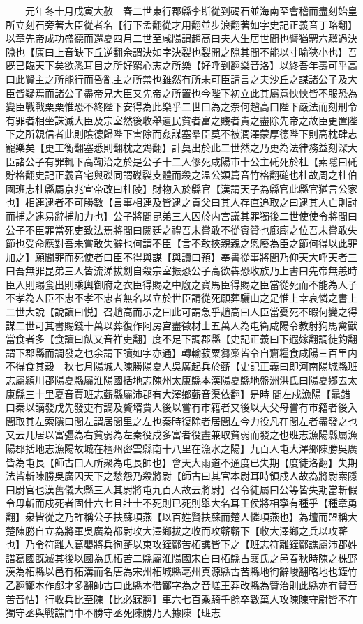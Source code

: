 　　元年冬十月戊寅大赦　春二世東行郡縣李斯從到碣石並海南至會稽而盡刻始皇所立刻石旁著大臣從者名【行下孟翻從才用翻並步浪翻著如字史記正義音丁略翻】以章先帝成功盛德而還夏四月二世至咸陽謂趙高曰夫人生居世間也譬猶騁六驥過決隙也【康曰上音缺下丘逆翻余謂決如字決裂也裂開之隙其間不能以寸喻狹小也】吾旣已臨天下矣欲悉耳目之所好窮心志之所樂【好呼到翻樂音洛】以終吾年壽可乎高曰此賢主之所能行而昏亂主之所禁也雖然有所未可臣請言之夫沙丘之謀諸公子及大臣皆疑焉而諸公子盡帝兄大臣又先帝之所置也今陛下初立此其屬意怏怏皆不服恐為變臣戰戰栗栗惟恐不終陛下安得為此樂乎二世曰為之奈何趙高曰陛下嚴法而刻刑令有罪者相坐誅滅大臣及宗室然後收舉遺民貧者富之賤者貴之盡除先帝之故臣更置陛下之所親信者此則隂德歸陛下害除而姦謀塞羣臣莫不被潤澤蒙厚德陛下則高枕肆志寵樂矣【更工衡翻塞悉則翻枕之鴆翻】計莫出於此二世然之乃更為法律務益刻深大臣諸公子有罪輒下高鞠治之於是公子十二人僇死咸陽市十公主矺死於杜【索隱曰矺貯格翻史記正義音宅與磔同謂磔裂支體而殺之温公類篇音竹格翻磓也杜故周之杜伯國班志杜縣屬京兆宣帝改曰杜陵】財物入於縣官【漢謂天子為縣官此縣官猶言公家也】相連逮者不可勝數【言事相連及皆逮之貢父曰其人存直追取之曰逮其人亡則討而捕之逮易辭捕加力也】公子將閭昆弟三人囚於内宫議其罪獨後二世使使令將閭曰公子不臣罪當死吏致法焉將閭曰闕廷之禮吾未嘗敢不從賓贊也廊廟之位吾未嘗敢失節也受命應對吾未嘗敢失辭也何謂不臣【言不敢挾親親之恩廢為臣之節何得以此罪加之】願聞罪而死使者曰臣不得與謀【與讀曰預】奉書從事將閭乃仰天大呼天者三曰吾無罪昆弟三人皆流涕拔劍自殺宗室振恐公子高欲犇恐收族乃上書曰先帝無恙時臣入則賜食出則乘輿御府之衣臣得賜之中廐之寶馬臣得賜之臣當從死而不能為人子不孝為人臣不忠不孝不忠者無名以立於世臣請從死願葬驪山之足惟上幸哀憐之書上二世大說【說讀曰悦】召趙高而示之曰此可謂急乎趙高曰人臣當憂死不暇何變之得謀二世可其書賜錢十萬以葬復作阿房宫盡徵材士五萬人為屯衛咸陽令教射狗馬禽獸當食者多【食讀曰飤又音祥吏翻】度不足下調郡縣【史記正義曰下遐嫁翻調徒釣翻謂下郡縣而調發之也余謂下讀如字亦通】轉輸菽粟芻槀皆令自齎糧食咸陽三百里内不得食其穀　秋七月陽城人陳勝陽夏人吳廣起兵於蘄【史記正義曰即河南陽城縣班志屬潁川郡陽夏縣屬淮陽國括地志陳州太康縣本漢陽夏縣地盤洲洪氏曰陽夏鄉去太康縣三十里夏音賈班志蘄縣屬沛郡有大澤鄉蘄音渠依翻】是時閭左戍漁陽【鼂錯曰秦以謫發戌先發吏有謫及贅壻賈人後以嘗有市籍者又後以大父母嘗有市籍者後入閭取其左索隱曰閭左謂居閭里之左也秦時復除者居閭左今力役凡在閭左者盡發之也又云几居以富彊為右貧弱為左秦役戍多富者役盡兼取貧弱而發之也班志漁陽縣屬漁陽郡括地志漁陽故城在檀州密雲縣南十八里在漁水之陽】九百人屯大澤鄉陳勝吳廣皆為屯長【師古曰人所聚為屯長帥也】會天大雨道不通度已失期【度徒洛翻】失期法皆斬陳勝吳廣因天下之愁怨乃殺將尉【師古曰其官本尉耳時領戍人故為將尉索隱曰尉官也漢舊儀大縣三人其尉將屯九百人故云將尉】召令徒屬曰公等皆失期當斬假令毋斬而戍死者固什六七且壯士不死則已死則舉大名耳王侯將相寧有種乎【種章勇翻】衆皆從之乃詐稱公子扶蘇項燕【以百姓賢扶蘇而楚人憐項燕也】為壇而盟稱大楚陳勝自立為將軍吳廣為都尉攻大澤鄉拔之收而攻蘄蘄下【收大澤鄉之兵以攻蘄也】乃令符離人葛嬰將兵徇蘄以東攻銍酇苦柘譙皆下之【班志符離銍酇譙屬沛郡姓譜葛國旣滅其後以國為氏柘苦二縣屬淮陽國宋白曰柘縣古襄氏之邑春秋時陳之株野漢為柘縣以邑有柘溝而名唐為宋州柘城縣亳州真源縣古苦縣地徇辭峻翻略地也銍竹乙翻酇本作䣜才多翻師古曰此縣本借酇字為之音嵯王莽改縣為贊治則此縣亦冇贊音苦音怙】行收兵比至陳【比必寐翻】車六七百乘騎千餘卒數萬人攻陳陳守尉皆不在獨守丞與戰譙門中不勝守丞死陳勝乃入據陳【班志